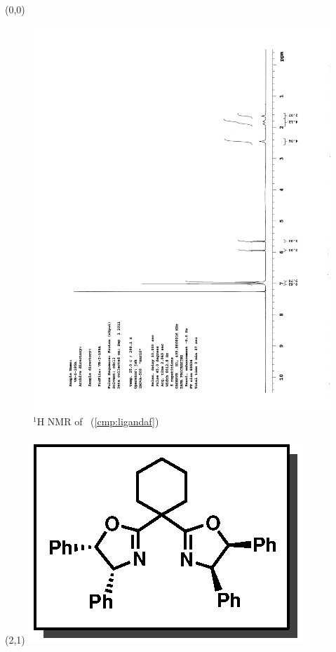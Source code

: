 \begin{textblock}{20}(0,0)
\begin{figure}[htb]
\caption{$^1$H NMR of \CMPligandaf\ (\ref{cmp:ligandaf})}
\includegraphics[scale=0.75, trim = 0mm 0mm 0mm 5mm,
clip]{chp_asymmetric/images/nmr/ligandafH}
\vspace{-100pt}
\end{figure}
\end{textblock}
\begin{textblock}{1}(2,1)
\includegraphics[scale=0.8, angle=90]{chp_asymmetric/images/ligandaf}
\end{textblock}
